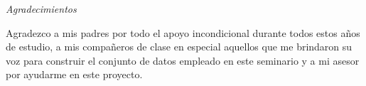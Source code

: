 \documentclass[12pt,spanish, singlespacing,]{MastersDoctoralThesis}
\newcommand\blankpage{%
    \null
    \thispagestyle{empty}%
    \addtocounter{page}{0}%
    \newpage}
\begin{document}
\newpage
\begin{center}
{\huge \textit{Agradecimientos}}\\[1.5cm]
\end{center}

Agradezco a mis padres por todo el apoyo incondicional durante todos estos años de estudio, a mis compañeros de clase en especial aquellos que me brindaron su voz para construir el conjunto de datos empleado en este seminario y a mi asesor por ayudarme en este proyecto.



\afterpage{\blankpage}

\mainmatter 
\pagestyle{thesis}


$\ $

$\ $

$\ $






\afterpage{\blankpage}
\appendix

\end{document}
